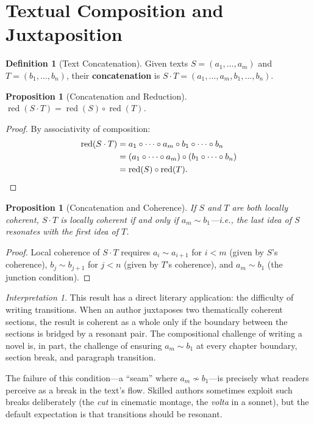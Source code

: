 \documentclass[11pt,openany]{book}
\theoremstyle{definition}
\newtheorem{definition}[axiom]{Definition}
\theoremstyle{plain}
\newtheorem{proposition}[axiom]{Proposition}
\theoremstyle{remark}
\newtheorem{interpretation}[axiom]{Interpretation}
\newcommand{\compose}{\circ}                 %
\newcommand{\res}{\sim}                      %
\begin{document}
\section{Textual Composition and Juxtaposition}

\begin{definition}[Text Concatenation]
Given texts $S = (a_1, \ldots, a_m)$ and $T = (b_1, \ldots, b_n)$, their \textbf{concatenation} is $S \cdot T = (a_1, \ldots, a_m, b_1, \ldots, b_n)$.
\end{definition}

\begin{proposition}[Concatenation and Reduction]
$\operatorname{red}(S \cdot T) = \operatorname{red}(S) \compose \operatorname{red}(T)$.
\end{proposition}

\begin{proof}
By associativity of composition:
\begin{align*}
\operatorname{red}(S \cdot T) &= a_1 \compose \cdots \compose a_m \compose b_1 \compose \cdots \compose b_n \\
&= (a_1 \compose \cdots \compose a_m) \compose (b_1 \compose \cdots \compose b_n) \\
&= \operatorname{red}(S) \compose \operatorname{red}(T). \qedhere
\end{align*}
\end{proof}

\begin{proposition}[Concatenation and Coherence]
If $S$ and $T$ are both locally coherent, $S \cdot T$ is locally coherent if and only if $a_m \res b_1$---i.e., the last idea of $S$ resonates with the first idea of $T$.
\end{proposition}

\begin{proof}
Local coherence of $S \cdot T$ requires $a_i \res a_{i+1}$ for $i < m$ (given by $S$'s coherence), $b_j \res b_{j+1}$ for $j < n$ (given by $T$'s coherence), and $a_m \res b_1$ (the junction condition).
\end{proof}

\begin{interpretation}
This result has a direct literary application: the difficulty of writing transitions. When an author juxtaposes two thematically coherent sections, the result is coherent as a whole only if the boundary between the sections is bridged by a resonant pair. The compositional challenge of writing a novel is, in part, the challenge of ensuring $a_m \res b_1$ at every chapter boundary, section break, and paragraph transition.

The failure of this condition---a ``seam'' where $a_m \not\res b_1$---is precisely what readers perceive as a break in the text's flow. Skilled authors sometimes exploit such breaks deliberately (the \emph{cut} in cinematic montage, the \emph{volta} in a sonnet), but the default expectation is that transitions should be resonant.
\end{interpretation}
\end{document}
